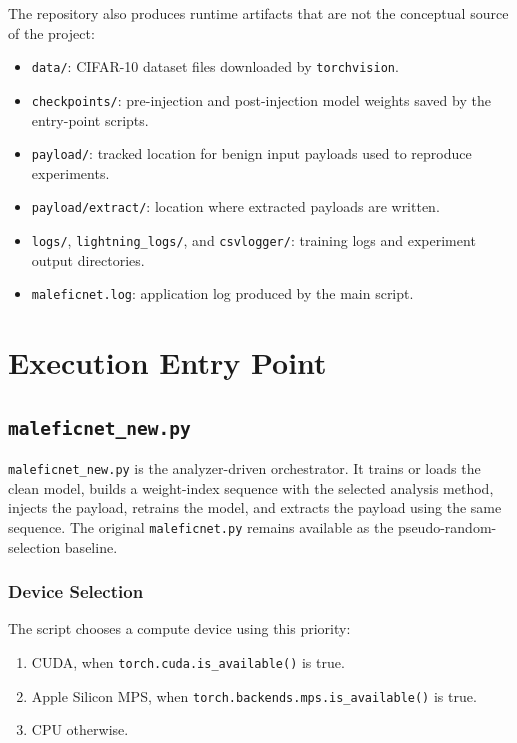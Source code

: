 \documentclass[11pt,a4paper]{article}
\newcommand{\code}[1]{\texttt{#1}}
\begin{document}
The repository also produces runtime artifacts that are not the conceptual source of the project:

\begin{itemize}[leftmargin=1.4em]
  \item \code{data/}: CIFAR-10 dataset files downloaded by \code{torchvision}.
  \item \code{checkpoints/}: pre-injection and post-injection model weights saved by the entry-point scripts.
  \item \code{payload/}: tracked location for benign input payloads used to reproduce experiments.
  \item \code{payload/extract/}: location where extracted payloads are written.
  \item \code{logs/}, \code{lightning\_logs/}, and \code{csvlogger/}: training logs and experiment output directories.
  \item \code{maleficnet.log}: application log produced by the main script.
\end{itemize}

\section{Execution Entry Point}

\subsection{\code{maleficnet\_new.py}}

\code{maleficnet\_new.py} is the analyzer-driven orchestrator. It trains or loads the clean model, builds a weight-index sequence with the selected analysis method, injects the payload, retrains the model, and extracts the payload using the same sequence. The original \code{maleficnet.py} remains available as the pseudo-random-selection baseline.

\subsubsection{Device Selection}

The script chooses a compute device using this priority:

\begin{enumerate}[leftmargin=1.6em]
  \item CUDA, when \code{torch.cuda.is\_available()} is true.
  \item Apple Silicon MPS, when \code{torch.backends.mps.is\_available()} is true.
  \item CPU otherwise.
\end{enumerate}
\end{document}
